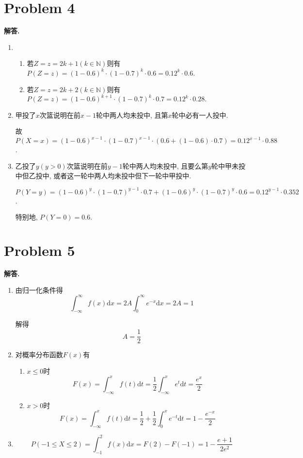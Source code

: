 \documentclass[11pt]{article}
\newcommand{\N}{{\mathbb{N}}}
\newenvironment{solution}{\par\noindent\textbf{解答. }}{\par}
\renewcommand{\d}{\mathrm{d}}
\begin{document}
	\section{Problem 4}
	\begin{solution}
		\begin{enumerate}[(1)]
			\item \begin{enumerate}
				\item 若$Z=z=2k+1(k\in\N)$则有$P(Z=z)=(1-0.6)^k\cdot (1-0.7)^k\cdot 0.6=0.12^k\cdot 0.6$.
				\item 若$Z=z=2k+2(k\in\N)$则有$P(Z=z)=(1-0.6)^{k+1}\cdot(1-0.7)^k\cdot0.7=0.12^k\cdot 0.28$.
			\end{enumerate}
			\item 甲投了$x$次篮说明在前$x-1$轮中两人均未投中, 且第$x$轮中必有一人投中.
			
			故$P(X=x)=(1-0.6)^{x-1}\cdot(1-0.7)^{x-1}\cdot (0.6+(1-0.6)\cdot 0.7)=0.12^{x-1}\cdot 0.88$.
			\item  乙投了$y(y>0)$次篮说明在前$y-1$轮中两人均未投中, 且要么第$y$轮中甲未投中但乙投中, 或者这一轮中两人均未投中但下一轮中甲投中.
			
			$P(Y=y)=(1-0.6)^y\cdot (1-0.7)^{y-1}\cdot0.7+(1-0.6)^y\cdot (1-0.7)^y\cdot 0.6=0.12^{y-1}\cdot0.352$.
			
			特别地, $P(Y=0)=0.6$.
		\end{enumerate}
	\end{solution}

	\section{Problem 5}
	\begin{solution}
		\begin{enumerate}[(1)]
			\item 由归一化条件得$$\int_{-\infty}^{\infty}f(x)\d x=2A\int_{0}^\infty e^{-x}\d x=2A=1$$
			
			解得$$A=\frac{1}{2}$$
			
			\item 对概率分布函数$F(x)$有
			\begin{enumerate}
				\item $x\leq 0$时 $$F(x)=\int_{-\infty}^x f(t)\d t=\frac{1}{2}\int_{-\infty}^x e^t\d t=\frac{e^x}{2}$$
				\item $x>0$时 $$F(x)=\int_{-\infty}^xf(t)\d t=\frac{1}{2}+\frac{1}{2}\int_{0}^{x}e^{-t}\d t=1-\frac{e^{-x}}{2}$$
			\end{enumerate}
		
			\item $$P(-1\leq X\leq 2)=\int_{-1}^{2} f(x)\d x=F(2)-F(-1)=1-\frac{e+1}{2e^2}$$
		\end{enumerate}
	\end{solution}
\end{document}
